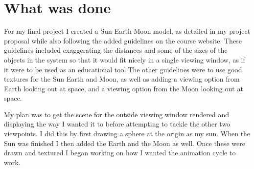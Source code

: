 \documentclass[12pt,serif,draftclsnofoot,onecolumn]{IEEEtran}
\begin{document}
	\section{What was done}
	\par	
			For my final project I created a Sun-Earth-Moon model, as detailed in my project proposal while also following the added guidelines on the course website. These guidelines included exaggerating the distances and some of the sizes of the objects in the system so that it would fit nicely in a single viewing window, as if it were to be used as an educational tool.The other guidelines were to use good textures for the Sun Earth and Moon, as well as adding a viewing option from Earth looking out at space, and a viewing option from the Moon looking out at space.
	\newline
	\par
			My plan was to get the scene for the outside viewing window rendered and displaying the way I wanted it to before attempting to tackle the other two viewpoints. I did this by first drawing a sphere at the origin as my sun. When the Sun was finished I then added the Earth and the Moon as well. Once these were drawn and textured I began working on how I wanted the animation cycle to work.
	\newline
\end{document}
